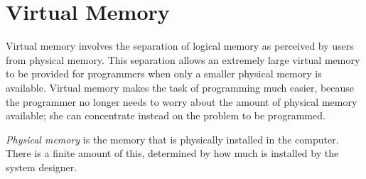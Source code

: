 \section{Virtual Memory}\label{sec:Virtual_Memory}
\begin{definition}\label{def:Virtual_Memory}
  Virtual memory involves the separation of logical memory as perceived
  by users from physical memory.
  This separation allows an extremely large virtual memory to be provided for programmers when only a smaller physical memory is available.
  Virtual memory makes the task of programming much easier, because the programmer no longer needs to worry about the amount of physical memory available; she can concentrate instead on the problem to be programmed.
\end{definition}

\begin{definition}\label{def:Physical_Memory}
  \emph{Physical memory} is the memory that is physically installed in the computer.
  There is a finite amount of this, determined by how much is installed by the system designer.
\end{definition}


